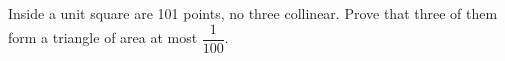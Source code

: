 Inside a unit square are 101 points, no three collinear. Prove that three of them form a triangle of area at most $\dfrac{1}{100}$.
